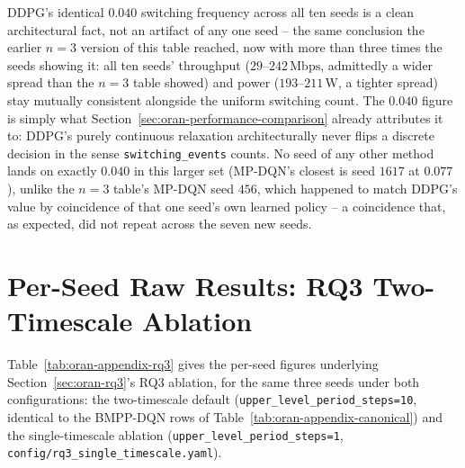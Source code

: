 {\sloppy
DDPG's identical $0.040$ switching frequency across all ten seeds is a
clean architectural fact, not an artifact of any one seed -- the same
conclusion the earlier $n=3$ version of this table reached, now with
more than three times the seeds showing it: all ten seeds' throughput
($29$--$242\,\mathrm{Mbps}$, admittedly a wider spread than the $n=3$
table showed) and power ($193$--$211\,\mathrm{W}$, a tighter spread) stay
mutually consistent alongside the uniform switching count. The $0.040$
figure is simply what Section~\ref{sec:oran-performance-comparison}
already attributes it to: DDPG's purely continuous relaxation
architecturally never flips a discrete decision in the sense
\texttt{switching\_events} counts. No seed of any other method lands on
exactly $0.040$ in this larger set (MP-DQN's closest is seed $1617$ at
$0.077$), unlike the $n=3$ table's MP-DQN seed $456$, which happened to
match DDPG's value by coincidence of that one seed's own learned policy
-- a coincidence that, as expected, did not repeat across the seven new
seeds.
\par}

\section{Per-Seed Raw Results: RQ3 Two-Timescale Ablation}
\label{sec:oran-appendix-perseed-rq3}

{\sloppy
Table~\ref{tab:oran-appendix-rq3} gives the per-seed figures underlying
Section~\ref{sec:oran-rq3}'s RQ3 ablation, for the same three seeds under
both configurations: the two-timescale default
(\texttt{upper\_level\_period\_steps=10}, identical to the BMPP-DQN rows
of Table~\ref{tab:oran-appendix-canonical}) and the single-timescale
ablation (\texttt{upper\_level\_period\_steps=1},
\texttt{config/\allowbreak rq3\_single\_timescale.yaml}).
\par}


